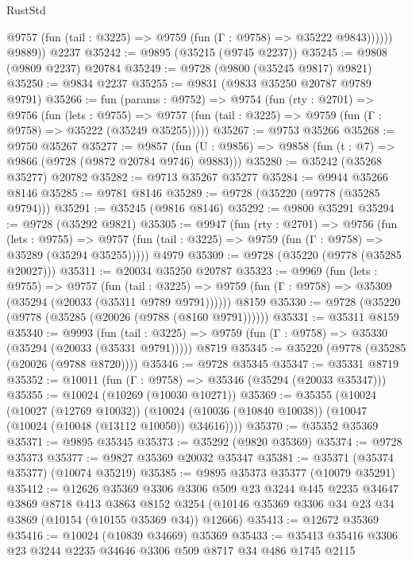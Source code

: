 \begin{lexlean}{RustStd}
\begin{coremodule}
{\begin{coremodule}
{{{{{{{{{{{{{{{{{{{{{{{{{{              @9757 (fun (tail : @3225) => @9759 (fun (Γ : @9758) => @35222 @9843))))))
        @9889))
    @2237
@35242 := @9895 (@35215 (@9745 @2237))
@35245 := @9808 (@9809 @2237) @20784
@35249 := @9728 (@9800 (@35245 @9817) @9821)
@35250 := @9834 @2237
@35255 := @9831 (@9833 @35250 @20787 @9789 @9791)
@35266 := fun (params : @9752) =>
  @9754
    (fun (rty : @2701) =>
    @9756
      (fun (lets : @9755) =>
      @9757 (fun (tail : @3225) => @9759 (fun (Γ : @9758) => @35222 (@35249 @35255)))))
@35267 := @9753 @35266
@35268 := @9750 @35267
@35277 := @9857
    (fun (U : @9856) => @9858 (fun (t : @7) => @9866 (@9728 (@9872 @20784 @9746) @9883)))
@35280 := @35242 (@35268 @35277) @20782
@35282 := @9713 @35267 @35277
@35284 := @9944 @35266 @8146
@35285 := @9781 @8146
@35289 := @9728 (@35220 (@9778 (@35285 @9794)))
@35291 := @35245 (@9816 @8146)
@35292 := @9800 @35291
@35294 := @9728 (@35292 @9821)
@35305 := @9947
    (fun (rty : @2701) =>
    @9756
      (fun (lets : @9755) =>
      @9757 (fun (tail : @3225) => @9759 (fun (Γ : @9758) => @35289 (@35294 @35255)))))
    @4979
@35309 := @9728 (@35220 (@9778 (@35285 @20027)))
@35311 := @20034 @35250 @20787
@35323 := @9969
    (fun (lets : @9755) =>
    @9757
      (fun (tail : @3225) =>
      @9759 (fun (Γ : @9758) => @35309 (@35294 (@20033 (@35311 @9789 @9791))))))
    @8159
@35330 := @9728 (@35220 (@9778 (@35285 (@20026 (@9788 (@8160 @9791))))))
@35331 := @35311 @8159
@35340 := @9993
    (fun (tail : @3225) => @9759 (fun (Γ : @9758) => @35330 (@35294 (@20033 (@35331 @9791)))))
    @8719
@35345 := @35220 (@9778 (@35285 (@20026 (@9788 @8720))))
@35346 := @9728 @35345
@35347 := @35331 @8719
@35352 := @10011 (fun (Γ : @9758) => @35346 (@35294 (@20033 @35347)))
@35355 := @10024 (@10269 (@10030 @10271))
@35369 := @35355
    (@10024
      (@10027 (@12769 @10032))
      (@10024 (@10036 (@10840 @10038)) (@10047 (@10024 (@10048 (@13112 @10050)) @34616))))
@35370 := @35352 @35369
@35371 := @9895 @35345
@35373 := @35292 (@9820 @35369)
@35374 := @9728 @35373
@35377 := @9827 @35369 @20032 @35347
@35381 := @35371 (@35374 @35377) (@10074 @35219)
@35385 := @9895 @35373 @35377 (@10079 @35291)
@35412 := @12626
    @35369
    @3306
    @3306
    @509
    @23
    @3244
    @445
    @2235
    @34647
    @3869
    @8718
    @413
    @3863
    @8152
    @3254
    (@10146 @35369 @3306 @34 @23 @34 @3869 (@10154 (@10155 @35369 @34)) @12666)
@35413 := @12672 @35369
@35416 := @10024 (@10839 @34669) @35369
@35433 := @35413
    @35416
    @3306
    @23
    @3244
    @2235
    @34646
    @3306
    @509
    @8717
    @34
    @486
    @1745
    @2115
}}}}}}}}}}}}}}}}}}}}}}}}}}
\end{coremodule}}
\end{coremodule}
\end{lexlean}
